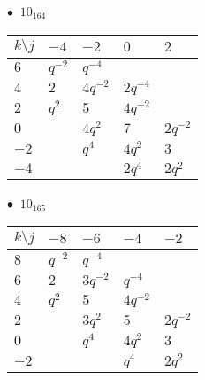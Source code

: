 %
\begin{minipage}{\linewidth}
$\bullet\ $ $10_{164}$ \vspace{0.5em} \\
\begin{tabular}{l|llll}
$k \setminus j$ & $-4$ & $-2$ & $0$ & $2$ \\
\hline
$6$ & $q^{-2}$ & $q^{-4}$ &  &  \\
$4$ & $2$ & $4q^{-2}$ & $2q^{-4}$ &  \\
$2$ & $q^{2}$ & $5$ & $4q^{-2}$ &  \\
$0$ &  & $4q^{2}$ & $7$ & $2q^{-2}$ \\
$-2$ &  & $q^{4}$ & $4q^{2}$ & $3$ \\
$-4$ &  &  & $2q^{4}$ & $2q^{2}$ \\
\end{tabular}
\vspace{2em}
\end{minipage}
%
\begin{minipage}{\linewidth}
$\bullet\ $ $10_{165}$ \vspace{0.5em} \\
\begin{tabular}{l|llll}
$k \setminus j$ & $-8$ & $-6$ & $-4$ & $-2$ \\
\hline
$8$ & $q^{-2}$ & $q^{-4}$ &  &  \\
$6$ & $2$ & $3q^{-2}$ & $q^{-4}$ &  \\
$4$ & $q^{2}$ & $5$ & $4q^{-2}$ &  \\
$2$ &  & $3q^{2}$ & $5$ & $2q^{-2}$ \\
$0$ &  & $q^{4}$ & $4q^{2}$ & $3$ \\
$-2$ &  &  & $q^{4}$ & $2q^{2}$ \\
\end{tabular}
\vspace{2em}
\end{minipage}
%